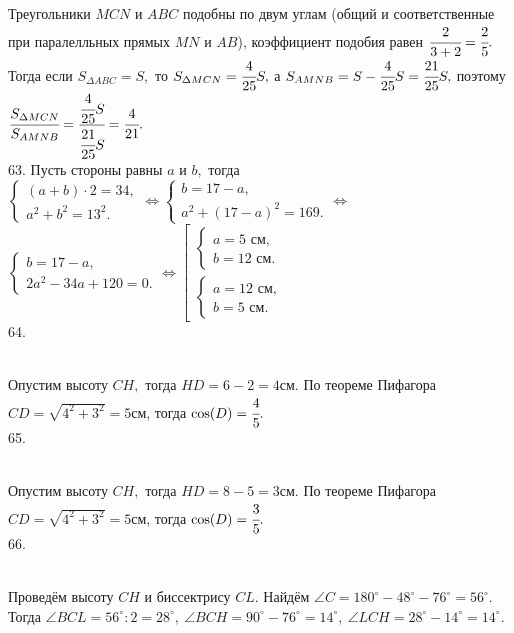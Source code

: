 Треугольники $MCN$ и $ABC$ подобны по двум углам (общий и соответственные при паралелльных прямых $MN$ и $AB$), коэффициент подобия равен $\cfrac{2}{3+2}=\cfrac{2}{5}.$ Тогда если $S_{\Delta ABC}=S,$ то $S_{\Delta MCN}=\cfrac{4}{25}S,$ а $S_{AMNB}=S-\cfrac{4}{25}S=\cfrac{21}{25}S,$ поэтому $\cfrac{S_{\Delta MCN}}{S_{AMNB}}=\cfrac{\cfrac{4}{25}S}{\cfrac{21}{25}S}=\cfrac{4}{21}.$\\
63. Пусть стороны равны $a$ и $b,$ тогда $\begin{cases}(a+b)\cdot2=34,\\ a^2+b^2=13^2.\end{cases}\Leftrightarrow
\begin{cases}b=17-a,\\ a^2+(17-a)^2=169.\end{cases}\Leftrightarrow$\\$
\begin{cases}b=17-a,\\ 2a^2-34a+120=0.\end{cases}\Leftrightarrow
\left[\begin{array}{l}\begin{cases}a=5\text{ см},\\ b=12\text{ см}.\end{cases}\\ \begin{cases}a=12\text{ см},\\ b=5\text{ см}.\end{cases}\end{array}\right.$\\
64. \begin{figure}[ht!]
\end{figure}\\
Опустим высоту $CH,$ тогда $HD=6-2=4$см. По теореме Пифагора $CD=\sqrt{4^2+3^2}=5$см, тогда $\cos(D)=\cfrac{4}{5}.$\\
65. \begin{figure}[ht!]
\end{figure}\\
Опустим высоту $CH,$ тогда $HD=8-5=3$см. По теореме Пифагора $CD=\sqrt{4^2+3^2}=5$см, тогда $\cos(D)=\cfrac{3}{5}.$\\
66. \begin{figure}[ht!]
\end{figure}\\
Проведём высоту $CH$ и биссектрису $CL.$ Найдём $\angle C=180^\circ-48^\circ-76^\circ=56^\circ.$ Тогда $\angle BCL=56^\circ:2=28^\circ,\ \angle BCH=90^\circ-76^\circ=14^\circ,\ \angle LCH=28^\circ-14^\circ=14^\circ.$\\
